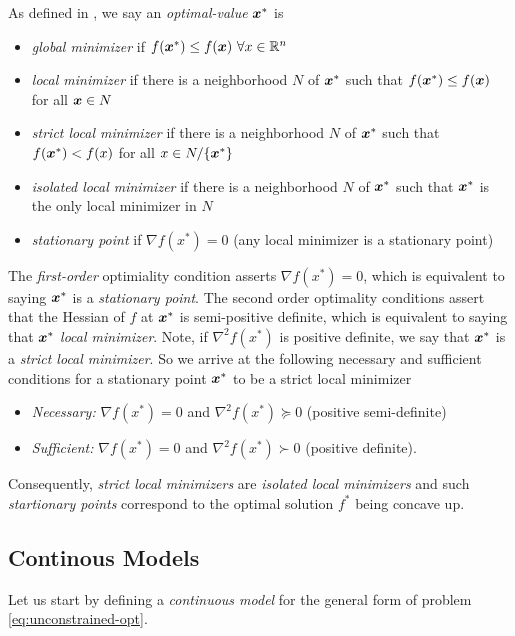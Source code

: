 \documentclass[10pt]{article}
\begin{document}
    As defined in \cite{NocedalAndWright06}, we say an \emph{optimal-value} $\bm{x}^*$ is
    \begin{itemize}
        \item \emph{global minimizer} if $f(\bm{x}^*) \leq f(\bm{x}) ~ \forall x \in \mathbb{R}^n$
        \item \emph{local minimizer} if there is a neighborhood $N$ of $\bm{x}^*$
        such that $f(\bm{x}^*) \leq f(\bm{x})$ for all $\bm{x} \in N$
        \item \emph{strict local minimizer} if there is a neighborhood $N$ of $\bm{x}^*$
        such that $f(\bm{x}^*) < f(x)$ for all $x \in N / \{ \bm{x}^*\}$
        \item \emph{isolated local minimizer} if there is a neighborhood $N$ of $\bm{x}^*$
        such that $\bm{x}^*$ is the only local minimizer in $N$
        \item \emph{stationary point} if $\nabla f(x^*) = 0$ (any local minimizer is a stationary point)
    \end{itemize}
    \medskip
    The \emph{first-order} optimiality condition asserts $\nabla f(x^*) = 0$,
    which is equivalent to saying $\bm{x}^*$ is a \emph{stationary point}.
    The second order optimality conditions assert that the Hessian of $f$
    at $\bm{x}^*$ is semi-positive definite, which is
    equivalent to saying that $\bm{x}^*$ \emph{local minimizer}.
    Note, if $\nabla^2 f(x^*)$ is positive definite, we say that $\bm{x}^*$ is a \emph{strict local minimizer}.
    So we arrive at the following necessary and sufficient conditions for a stationary point $\bm{x}^*$ 
    to be a strict local minimizer
    \begin{itemize}
        \item \emph{Necessary:} $\nabla f(x^*) = 0$ and $\nabla^2 f(x^*) \succeq 0 $ (positive semi-definite)
        \item \emph{Sufficient:} $\nabla f(x^*) = 0$ and $\nabla^2 f(x^*) \succ 0$ (positive definite).
    \end{itemize}
    Consequently, \emph{strict local minimizers} are \emph{isolated local minimizers} and
    such \emph{startionary points} correspond to the optimal solution $f^*$ being concave up.
    \medskip

    \subsection{Continous Models}
    
    Let us start by defining a \emph{continuous model} for the
    general form of problem \ref{eq:unconstrained-opt}.
    
\end{document}
